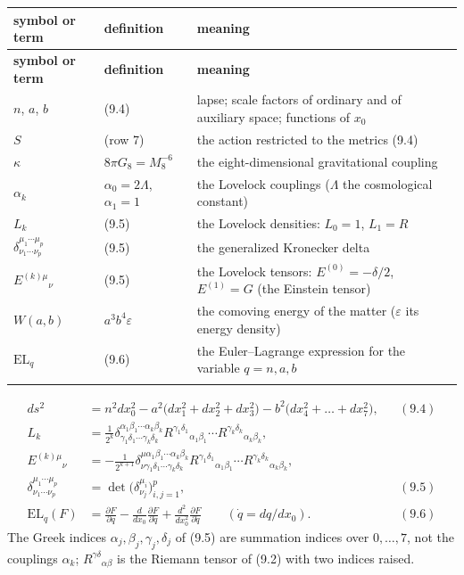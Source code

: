 \documentclass[10pt,a4paper]{article}
\begin{document}
{\footnotesize
\begin{longtable}{>{\raggedright\arraybackslash}p{}>{\raggedright\arraybackslash}p{}>{\raggedright\arraybackslash}p{}}
\toprule
\textbf{symbol or term} & \textbf{definition} & \textbf{meaning} \\
\midrule\endfirsthead
\toprule
\textbf{symbol or term} & \textbf{definition} & \textbf{meaning} \\
\midrule\endhead
\endfoot
\bottomrule\endlastfoot
$n$, $a$, $b$ & (9.4) & lapse; scale factors of ordinary and of auxiliary space; functions of $x_0$ \\
$S$ & (row 7) & the action restricted to the metrics (9.4) \\
$\kappa$ & $8\pi G_8=M_8^{-6}$ & the eight-dimensional gravitational coupling \\
$\alpha_k$ & $\alpha_0=2\Lambda$, $\alpha_1=1$ & the Lovelock couplings ($\Lambda$ the cosmological constant) \\
$L_k$ & (9.5) & the Lovelock densities: $L_0=1$, $L_1=R$ \\
$\delta^{\mu_1\cdots\mu_p}_{\nu_1\cdots\nu_p}$ & (9.5) & the generalized Kronecker delta \\
$E^{(k)\mu}{}_\nu$ & (9.5) & the Lovelock tensors: $E^{(0)}=-\delta/2$, $E^{(1)}=G$ (the Einstein tensor) \\
$W(a,b)$ & $a^3b^4\varepsilon$ & the comoving energy of the matter ($\varepsilon$ its energy density) \\
$\mathrm{EL}_q$ & (9.6) & the Euler–Lagrange expression for the variable $q=n,a,b$ \\*
\end{longtable}}
\begin{align*}
ds^2&=n^2dx_0^2-a^2\big(dx_1^2+dx_2^2+dx_3^2\big)-b^2\big(dx_4^2+\dots+dx_7^2\big),&&(9.4) \\
L_k&=\frac1{2^k}\delta^{\alpha_1\beta_1\cdots\alpha_k\beta_k}_{\gamma_1\delta_1\cdots\gamma_k\delta_k}R^{\gamma_1\delta_1}{}_{\alpha_1\beta_1}\cdots R^{\gamma_k\delta_k}{}_{\alpha_k\beta_k}, \\
E^{(k)\mu}{}_\nu&=-\frac1{2^{k+1}}\delta^{\mu\alpha_1\beta_1\cdots\alpha_k\beta_k}_{\nu\gamma_1\delta_1\cdots\gamma_k\delta_k}R^{\gamma_1\delta_1}{}_{\alpha_1\beta_1}\cdots R^{\gamma_k\delta_k}{}_{\alpha_k\beta_k}, \\
\delta^{\mu_1\cdots\mu_p}_{\nu_1\cdots\nu_p}&=\det\big(\delta^{\mu_i}_{\nu_j}\big)_{i,j=1}^p,&&(9.5) \\
\mathrm{EL}_q(F)&=\frac{\partial F}{\partial q}-\frac{d}{dx_0}\frac{\partial F}{\partial\dot q}+\frac{d^2}{dx_0^2}\frac{\partial F}{\partial\ddot q}\qquad(\dot q=dq/dx_0).&&(9.6)
\end{align*}
The Greek indices $\alpha_j,\beta_j,\gamma_j,\delta_j$ of (9.5) are summation indices over $0,\dots,7$, not the couplings $\alpha_k$; $R^{\gamma\delta}{}_{\alpha\beta}$ is the Riemann tensor of (9.2) with two indices raised.
\end{document}
